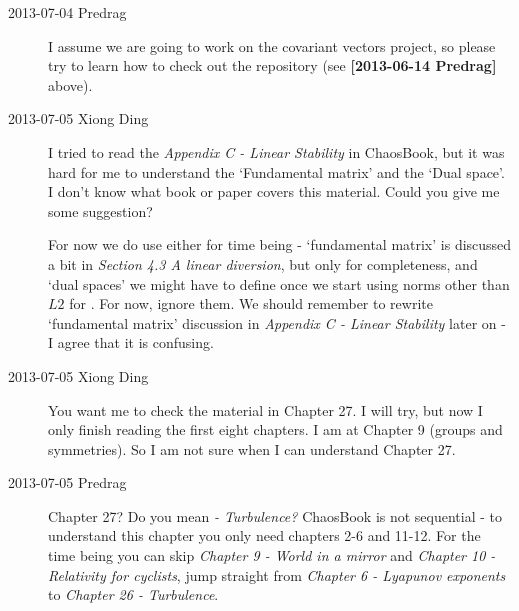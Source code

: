 \begin{description}
\item[2013-07-04 Predrag] I assume we are going to work on the
    covariant vectors project, so please try to learn how to check out
    the repository (see {\bf [2013-06-14 Predrag]} above).

\item[2013-07-05 Xiong Ding] I tried to read the \emph{Appendix C - Linear
    Stability} in ChaosBook, but it was hard for me to understand the
    `Fundamental matrix' and the `Dual space'. I don't know what book
    or paper covers this material. Could you give me some suggestion?

For now we do use either for time being - `fundamental matrix' is
discussed a bit in
\emph{ {Section 4.3} A
linear diversion}, but only for completeness, and `dual spaces' we might
have to define once we start using norms other than $L2$ for \KS. For
now, ignore them. We should remember to rewrite `fundamental matrix'
discussion in
\emph{ {Appendix
C} - Linear Stability} later on - I agree that it is confusing.

\item[2013-07-05 Xiong Ding]
You want me to check the material in Chapter 27. I
will try, but now I only finish reading the first eight chapters. I am
at Chapter 9 (groups and symmetries). So I am not sure when I can
understand Chapter 27.

\item[2013-07-05 Predrag] Chapter 27? Do you mean \emph{
 - Turbulence?}
ChaosBook is not sequential - to understand this chapter you only need
chapters 2-6 and 11-12. For the time being you can skip
{\em Chapter 9 - World in a mirror} and
{\em Chapter 10 - Relativity for cyclists}, jump straight from
{\em Chapter 6 - Lyapunov exponents} to {\em {Chapter 26} - Turbulence}.

\end{description}

\renewcommand{\ssp}{a}
